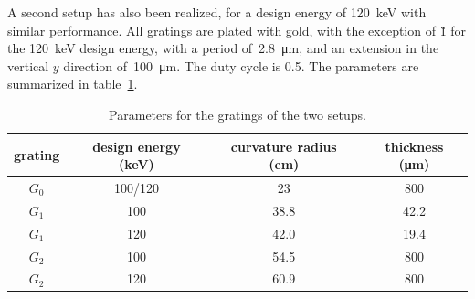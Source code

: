 A second setup has also been realized, for a design energy of
\SI{120}{\kilo\eV} with similar performance. All gratings are plated with
gold, with the exception of \G1 for the \SI{120}{\kilo\eV}
design energy, with a period of~\SI{2.8}{\micro\metre}, and an extension in
the vertical $y$ direction of~\SI{100}{\micro\metre}. The 
duty cycle is 0.5. The parameters are summarized in
table~\ref{tab:gratings}.

\begin{table}[htb]
    \centering
    \begin{tabular}{*4c}
        \toprule
        grating & design energy (\si{\kilo\eV}) & curvature radius
        (\si{\centi\metre}) & thickness (\si{\micro\metre}) \\
        \midrule
        $G_0$ & \num{100}/\num{120} & \num{23} & \num{800} \\
        $G_1$ & \num{100} & \num{38.8} & \num{42.2} \\
        $G_1$ & \num{120} & \num{42.0} & \num{19.4} \\
        $G_2$ & \num{100} & \num{54.5} & \num{800} \\
        $G_2$ & \num{120} & \num{60.9} & \num{800} \\
        \bottomrule
    \end{tabular}
    \caption{Parameters for the gratings of the two setups.}
    \label{tab:gratings}
\end{table}

